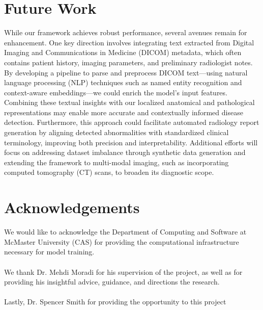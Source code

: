 \documentclass[10pt,twocolumn,letterpaper]{article}
\begin{document}
\section{Future Work}
While our framework achieves robust performance, several avenues remain for enhancement. One key direction involves integrating text extracted from Digital Imaging and Communications in Medicine (DICOM) metadata, which often contains patient history, imaging parameters, and preliminary radiologist notes. By developing a pipeline to parse and preprocess DICOM text—using natural language processing (NLP) techniques such as named entity recognition and context-aware embeddings—we could enrich the model’s input features. Combining these textual insights with our localized anatomical and pathological representations may enable more accurate and contextually informed disease detection. Furthermore, this approach could facilitate automated radiology report generation by aligning detected abnormalities with standardized clinical terminology, improving both precision and interpretability. Additional efforts will focus on addressing dataset imbalance through synthetic data generation and extending the framework to multi-modal imaging, such as incorporating computed tomography (CT) scans, to broaden its diagnostic scope.

\section*{Acknowledgements}
We would like to acknowledge the Department of Computing and Software at McMaster University (CAS) for providing the computational infrastructure necessary for model training.\\\\
We thank Dr. Mehdi Moradi for his supervision of the project, as well as for providing his insightful advice, guidance, and directions the research.\\\\
Lastly, Dr. Spencer Smith for providing the opportunity to this project\\\\
\end{document}
